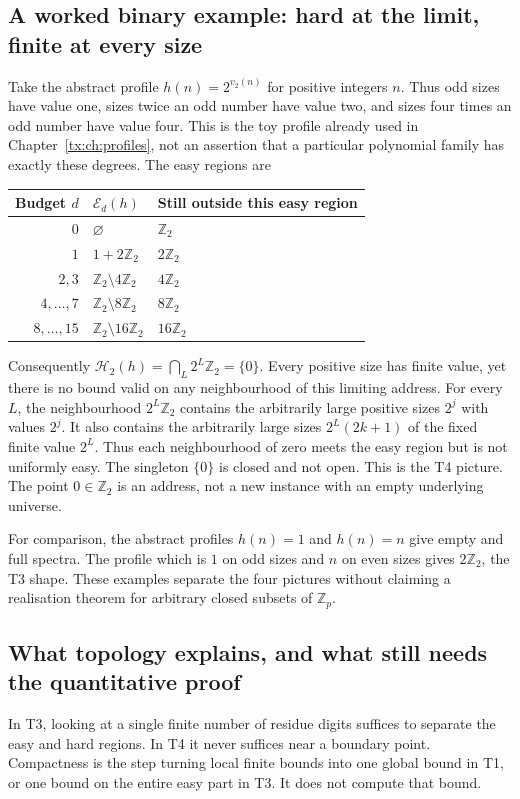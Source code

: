 \documentclass[11pt,a4paper,oneside,openany]{book}
\theoremstyle{definition}\newtheorem{definition}[theorem]{Definition}
\theoremstyle{remark}\newtheorem{remark}[theorem]{Remark}
\numberwithin{equation}{chapter}
\begin{document}
\subsection{A worked binary example: hard at the limit, finite at every size}
Take the abstract profile $h(n)=2^{v_2(n)}$ for positive integers $n$.
Thus odd sizes have value one, sizes twice an odd number have value
two, and sizes four times an odd number have value four. This is the
toy profile already used in Chapter~\ref{tx:ch:profiles}, not an
assertion that a particular polynomial family has exactly these degrees.
The easy regions are
\begin{center}
\begin{tabular}{@{}rll@{}}
\toprule
Budget $d$ & $\mathcal E_d(h)$ & Still outside this easy region\\
\midrule
$0$ & $\varnothing$ & $\mathbb Z_2$\\
$1$ & $1+2\mathbb Z_2$ & $2\mathbb Z_2$\\
$2,3$ & $\mathbb Z_2\setminus4\mathbb Z_2$ & $4\mathbb Z_2$\\
$4,\ldots,7$ & $\mathbb Z_2\setminus8\mathbb Z_2$ & $8\mathbb Z_2$\\
$8,\ldots,15$ & $\mathbb Z_2\setminus16\mathbb Z_2$ & $16\mathbb Z_2$\\
\bottomrule
\end{tabular}
\end{center}
Consequently $\mathcal H_2(h)=\bigcap_L2^L\mathbb Z_2=\{0\}$.
Every positive size has finite value, yet there is no bound valid on
any neighbourhood of this limiting address. For every $L$, the
neighbourhood $2^L\mathbb Z_2$ contains the arbitrarily large positive
sizes $2^j$ with values $2^j$. It also contains the arbitrarily large
sizes $2^L(2k+1)$ of the fixed finite value $2^L$.
Thus each neighbourhood of zero meets the easy region but is not
uniformly easy. The singleton $\{0\}$ is closed and not open.
This is the T4 picture. The point $0\in\mathbb Z_2$ is an address,
not a new instance with an empty underlying universe.

For comparison, the abstract profiles $h(n)=1$ and $h(n)=n$ give
empty and full spectra. The profile which is $1$ on odd sizes and
$n$ on even sizes gives $2\mathbb Z_2$, the T3 shape. These examples
separate the four pictures without claiming a realisation theorem
for arbitrary closed subsets of $\mathbb Z_p$.

\subsection{What topology explains, and what still needs the quantitative proof}
In T3, looking at a single finite number of residue digits suffices
to separate the easy and hard regions. In T4 it never suffices near
a boundary point. Compactness is the step turning local finite bounds
into one global bound in T1, or one bound on the entire easy part in T3.
It does not compute that bound.
\end{document}

